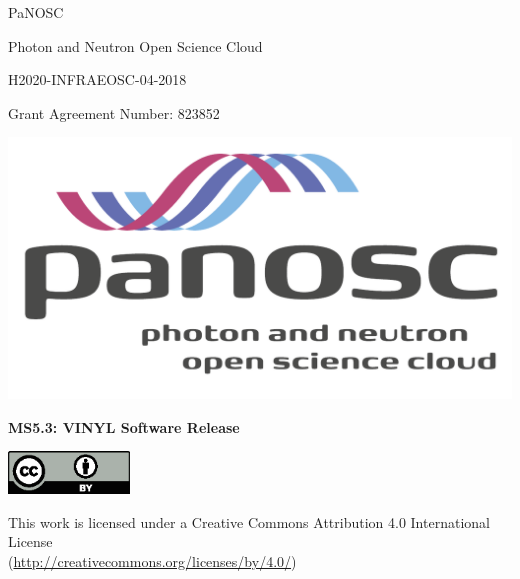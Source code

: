 \documentclass[11pt, a4paper]{article}
\begin{document}

{
	\centering
    \begin{onehalfspace}
    \sffamily
     \vspace*{5ex}
	{\fontsize{20}{24}\selectfont PaNOSC \par}
	{\fontsize{20}{24}\selectfont Photon and Neutron Open Science Cloud \par}
	{\fontsize{20}{24}\selectfont H2020-INFRAEOSC-04-2018 \par}
	{\fontsize{20}{24}\selectfont Grant Agreement Number: 823852 \par}
	\end{onehalfspace}

	\vspace*{7ex}
	\includegraphics[width=\textwidth]{PaNOSClogo_web_RGB.pdf}\par
	\vfill
	{\large \textbf{\sffamily MS5.3: VINYL Software Release}}\par
} %


\includegraphics[width=1.27in]{by.eps}\par
This work is licensed under a Creative Commons Attribution 4.0 International License\\
(\url{http://creativecommons.org/licenses/by/4.0/})\par

\newpage
\end{document}
